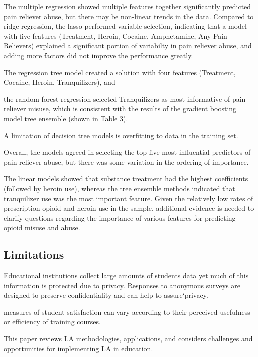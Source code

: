 \documentclass[sigconf]{acmart}
\begin{document}
The multiple regression showed multiple features together significantly 
predicted pain reliever abuse, but there may be non-linear trends in the data.
Compared to ridge regression, the lasso performed variable selection, 
indicating that a model with five features (Treatment, Heroin, Cocaine, 
Amphetamine, Any Pain Relievers) explained a significant portion of
variabilty in pain reliever abuse, and adding more factors did not improve
the performance greatly. 

The regression tree model created a solution
with four features (Treatment, Cocaine, Heroin, Tranquilizers), and 

the
random forest regression selected Tranquilizers as most informative of
pain reliever misuse, which is consistent with the results of the gradient
boosting model tree ensemble (shown in Table 3). 

A limitation of decision tree models is overfitting to data in the training set. 


Overall, the models 
agreed in selecting the top five most influential predictors of pain
reliever abuse, but there was some variation in the ordering of importance. 

The linear models showed that substance treatment had the highest
coefficients (followed by heroin use), whereas the tree ensemble methods
indicated that tranquilizer use was the most important feature. Given the 
relatively low rates of prescription opioid and heroin use in the sample, 
additional evidence is needed to clarify questions regarding the importance
of various features for predicting opioid misuse and abuse. 
 


\subsection{Limitations}

Educational institutions collect large amounts of students data yet much of
this information is protected due to privacy. Responses to anonymous surveys 
are designed to preserve confidentiality and can help to assure`privacy. 


measures of student satisfaction can vary according 
to their perceived usefulness or efficiency of training courses.

This paper reviews LA methodologies, applications, and considers challenges 
and opportunities for implementing LA in education.
\end{document}
